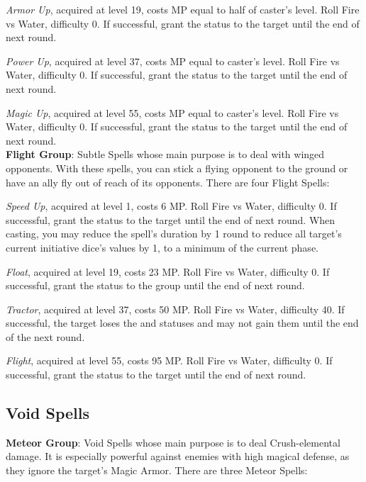 \begin{multicols}{2}
    \textit{Armor Up}, acquired at level 19, costs MP equal to half of caster's level. Roll Fire vs Water, difficulty 0. If successful, grant the  status to the target until the end of next round.
    
    \textit{Power Up}, acquired at level 37, costs MP equal to caster's level. Roll Fire vs Water, difficulty 0. If successful, grant the  status to the target until the end of next round.
    
    \textit{Magic Up}, acquired at level 55, costs MP equal to caster's level. Roll Fire vs Water, difficulty 0. If successful, grant the  status to the target until the end of next round.\\%
    
    \textbf{Flight Group}: Subtle Spells whose main purpose is to deal with winged opponents. With these spells, you can stick a flying opponent to the ground or have an ally fly out of reach of its opponents. There are four Flight Spells:
    
    \textit{Speed Up}, acquired at level 1, costs 6 MP\@. Roll Fire vs Water, difficulty 0. If successful, grant the  status to the target until the end of next round. When casting, you may reduce the spell's duration by 1 round to reduce all target's current initiative dice's values by 1, to a minimum of the current phase.
    
    \textit{Float}, acquired at level 19, costs 23 MP\@. Roll Fire vs Water, difficulty 0. If successful, grant the  status to the group until the end of next round.
    
    \textit{Tractor}, acquired at level 37, costs 50 MP\@. Roll Fire vs Water, difficulty 40. If successful, the target loses the  and  statuses and may not gain them until the end of the next round.
    
    \textit{Flight}, acquired at level 55, costs 95 MP\@. Roll Fire vs Water, difficulty 0. If successful, grant the  status to the target until the end of next round.
    
    \subsection{Void Spells}\label{subsec:time-void}

    \textbf{Meteor Group}: Void Spells whose main purpose is to deal Crush-elemental damage. It is especially powerful against enemies with high magical defense, as they ignore the target’s Magic Armor. There are three Meteor Spells:
    

\end{multicols}

